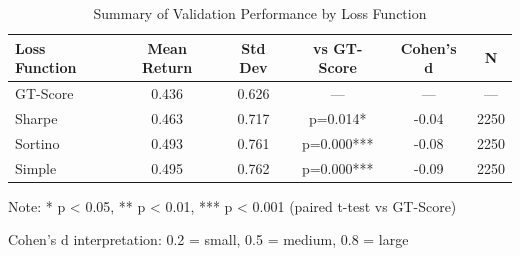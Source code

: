 
\begin{table}[htbp]
\centering
\caption{Summary of Validation Performance by Loss Function}
\label{tab:summary_results}
\begin{tabular}{lccccc}
\toprule
\textbf{Loss Function} & \textbf{Mean Return} & \textbf{Std Dev} & \textbf{vs GT-Score} & \textbf{Cohen's d} & \textbf{N} \\
\midrule
GT-Score & 0.436 & 0.626 & --- & --- & --- \\
Sharpe & 0.463 & 0.717 & p=0.014* & -0.04 & 2250 \\
Sortino & 0.493 & 0.761 & p=0.000*** & -0.08 & 2250 \\
Simple & 0.495 & 0.762 & p=0.000*** & -0.09 & 2250 \\

\bottomrule
\end{tabular}
\begin{tablenotes}
\small
\item Note: * p < 0.05, ** p < 0.01, *** p < 0.001 (paired t-test vs GT-Score)
\item Cohen's d interpretation: 0.2 = small, 0.5 = medium, 0.8 = large
\end{tablenotes}
\end{table}
